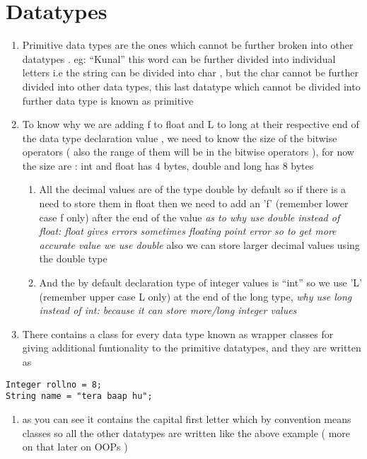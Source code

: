 \documentclass[11pt]{article}
\begin{document}
\section{Datatypes}
\label{sec:orgdba858b}
\begin{enumerate}
\item Primitive data types are the ones which cannot be further broken into other datatypes . eg: ``Kunal'' this word can be further divided into individual letters i.e the string can be divided into char , but the char cannot be further divided into other data types, this last datatype which cannot be divided into further data type is known as primitive
\item To know why we are adding f to float and L to long at their respective end of the data type declaration value , we need to know the size of the bitwise operators ( also the range of them will be in the bitwise operators ),
for now the size are : int and float has 4 bytes, double and long has 8 bytes
\begin{enumerate}
\item All the decimal values are of the type double by default so if there is a need to store them in float then we need to add an 'f' (remember lower case f only) after the end of the value
\emph{as to why use double instead of float: float gives errors sometimes floating point error so to get more accurate value we use double}
also we can  store larger decimal values using the double type
\item And the by default declaration type of integer values is ``int'' so we use 'L' (remember upper case L only) at the end of the long type,
\emph{why use long instead of int: because it can store more/long integer values}
\end{enumerate}

\item There contains a class for every data type known as wrapper classes for giving additional funtionality to the primitive datatypes, and they are written as
\end{enumerate}
\begin{verbatim}
Integer rollno = 8;
String name = "tera baap hu";
\end{verbatim}
\begin{enumerate}
\item as you can see it contains the capital first letter which by convention means classes so all the other datatypes are written like the above example ( more on that later on OOPs )
\end{enumerate}
\end{document}
